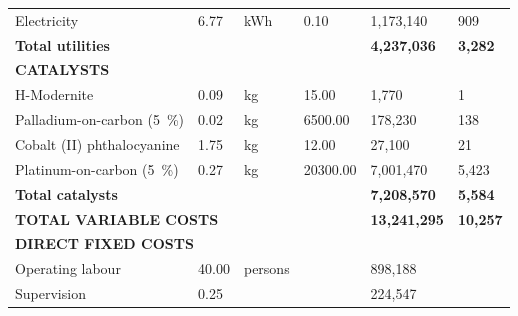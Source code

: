 \begin{table}[H]
\begin{tabular}{@{}llllll@{}}
Electricity                   & 6.77                  & kWh                                   & 0.10                      & 1,173,140                  & 909                  \\ \cline{5-6} 
\textbf{Total utilities}      & \textbf{}             & \textbf{}                             & \textbf{}                 & \textbf{4,237,036}         & \textbf{3,282}       \\
\textbf{CATALYSTS}            &                       &                                       &                           & \textbf{}                  &                      \\ \cline{1-1}
H-Modernite                   & 0.09                  & kg                                    & 15.00                     & 1,770                      & 1                    \\
Palladium-on-carbon (\SI{5}{\percent})     & 0.02                  & kg                                    & 6500.00                   & 178,230                    & 138                  \\
Cobalt (II) phthalocyanine    & 1.75                  & kg                                    & 12.00                     & 27,100                     & 21                   \\
Platinum-on-carbon (\SI{5}{\percent})      & 0.27                  & kg                                    & 20300.00                  & 7,001,470                  & 5,423                \\ \cline{5-6} 
\multicolumn{4}{l}{\textbf{Total catalysts}}                                                                              & \textbf{7,208,570}         & \textbf{5,584}       \\ \cline{5-6} 
\multicolumn{4}{l}{\textbf{TOTAL VARIABLE COSTS}}                                                                         & \textbf{13,241,295}        & \textbf{10,257}      \\
\multicolumn{2}{l}{\textbf{DIRECT FIXED COSTS}}       &                                       &                           & \textbf{}                  &                      \\ \cline{1-2}
Operating labour              & 40.00                 & persons                               &                           & 898,188                    &                      \\
Supervision                   & 0.25                  &                                       &                           & 224,547                    &                      \\

\end{tabular}
\end{table}
